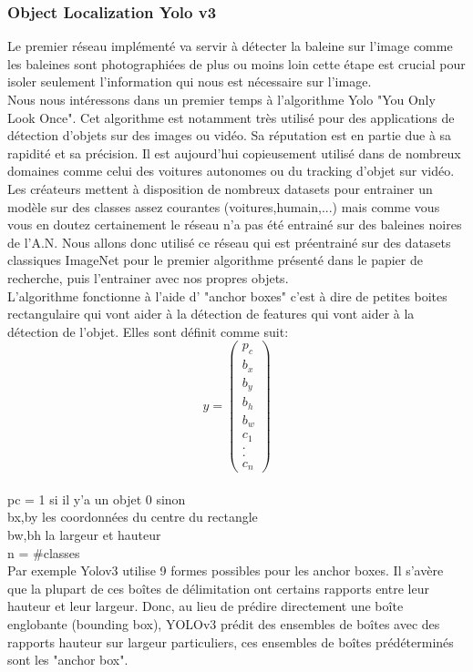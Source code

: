 \documentclass[12pt,a4paper]{report}
\begin{document}
\begin{spacing}{1.5}
\subsubsection{Object Localization Yolo v3}
Le premier réseau implémenté va servir à détecter la baleine sur l’image comme les baleines sont photographiées de plus ou moins loin cette étape est crucial pour isoler seulement l’information qui nous est nécessaire sur l’image.
\\
Nous nous intéressons dans un premier temps à l'algorithme Yolo "You Only Look Once". Cet algorithme est notamment très utilisé pour des applications de détection d'objets sur des images ou vidéo. Sa réputation est en partie due à sa rapidité et sa précision. Il est aujourd'hui copieusement utilisé dans de nombreux domaines comme celui des voitures autonomes ou du tracking d'objet sur vidéo.
\\
Les créateurs mettent à disposition de nombreux datasets pour entrainer un modèle sur des classes assez courantes (voitures,humain,...) mais comme vous vous en doutez certainement le réseau n'a pas été entrainé sur des baleines noires de l'A.N. Nous allons donc utilisé ce réseau qui est préentrainé sur des datasets classiques ImageNet pour le premier algorithme présenté dans le papier de recherche, puis l'entrainer avec nos propres objets. 
\\
\newpage
L'algorithme fonctionne à l'aide d' "anchor boxes" c'est à dire de petites boites rectangulaire qui vont aider à la détection de features qui vont aider à la détection de l'objet. 
Elles sont définit comme suit:
$$ y = \begin{pmatrix}
p_{c} \\
b_{x} \\
b_{y} \\
b_{h} \\
b_{w} \\
c_{1} \\
. \\
. \\
c_{n} 
\end{pmatrix} $$
\\pc = 1 si il y'a un objet 0 sinon 
\\bx,by les coordonnées du centre du rectangle 
\\bw,bh la largeur et hauteur
\\ n = \#classes 
\\Par exemple Yolov3 utilise 9 formes possibles pour les anchor boxes.
Il s’avère que la plupart de ces boîtes de délimitation ont certains rapports entre leur hauteur et leur largeur. Donc, au lieu de prédire directement une boîte englobante (bounding box), YOLOv3 prédit des ensembles de boîtes avec des rapports hauteur sur largeur particuliers, ces ensembles de boîtes prédéterminés sont les "anchor box". 

\end{spacing}
\end{document}
